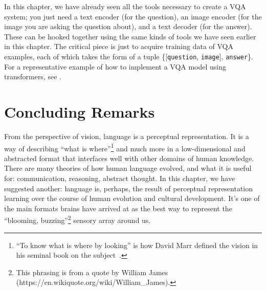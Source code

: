 In this chapter, we have already seen all the tools necessary to create a VQA system; you just need a text encoder (for the question), an image encoder (for the image you are asking the question about), and a text decoder (for the answer). These can be hooked together using the same kinds of tools we have seen earlier in this chapter. The critical piece is just to acquire training data of VQA examples, each of which takes the form of a tuple \{[\texttt{question}, \texttt{image}], \texttt{answer}\}. For a representative example of how to implement a VQA model using transformers, see \cite{li2023blip2}.








\section{Concluding Remarks}

From the perspective of vision, language is a perceptual representation. It is a way of describing ``what is where''\footnote{``To know what is where by looking'' is how David Marr defined the vision in his seminal book on the subject~\cite{Marr82}.} and much more in a low-dimensional and abstracted format that interfaces well with other domains of human knowledge. There are many theories of how human language evolved, and what it is useful for: communication, reasoning, abstract thought. In this chapter, we have suggested another: language is, perhaps, the result of perceptual representation learning over the course of human evolution and cultural development. It's one of the main formats brains have arrived at as the best way to represent the ``blooming, buzzing''\footnote{This phrasing is from a quote by William James (https://en.wikiquote.org/wiki/William\_James).} sensory array around us.
